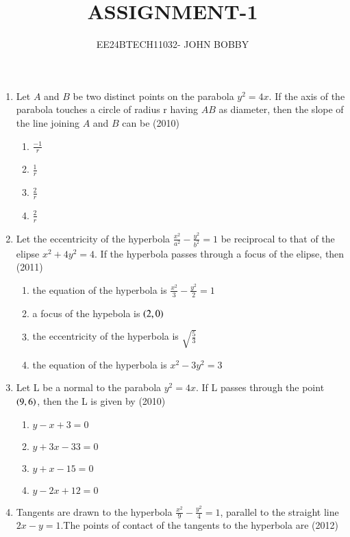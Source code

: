 \documentclass[journal,12pt,twocolumn]{IEEEtran}
\theoremstyle{remark}
\begin{document}

\vspace{3cm}

\title{ASSIGNMENT-1}
\author{EE24BTECH11032- JOHN BOBBY}
\maketitle
\newpage
\bigskip

\begin{enumerate}
	\item Let $A$ and $B$ be two distinct points on the parabola $y^2=4x$. If
the axis of the parabola touches a circle of radius r having
		$AB$ as diameter, then the slope of the line joining $A$ and $B$
 can be 
		\hfill(2010)
		
		\begin{enumerate}
			\item$\frac{-1}{r}$
			\item$\frac{1}{r}$
			\item$\frac{2}{r}$
			\item$\frac{2}{r}$
		\end{enumerate}
	\item Let the eccentricity of the hyperbola $\frac{x^2}{a^2}-\frac{y^2}{b^2}=1$ be reciprocal to that of the elipse $x^2+4y^2=4$. If the hyperbola
	passes through a focus of the elipse, then 
		\hfill(2011)
		
		\begin{enumerate}
			\item the equation of the hyperbola is $\frac{x^2}{3}-\frac{y^2}{2}=1$
			\item a focus of the hypebola is $\left(2,0\right)$
			\item the eccentricity of the hyperbola is $\sqrt{\frac{5}{3}}$
			\item the equation of the hyperbola is $x^2-3y^2=3$
		\end{enumerate}
	\item Let L be a normal to the parabola $y^2=4x$. If L passes through the point $\left(9,6\right)$, then the L is given by 
		\hfill(2010)
		
		\begin{enumerate}
			\item $y-x+3=0$
			\item $y+3x-33=0$
			\item $y+x-15=0$
			\item $y-2x+12=0$
		\end{enumerate}
	\item Tangents are drawn to the hyperbola $\frac{x^2}{9}-\frac{y^2}{4}=1$, parallel to the straight line $2x-y=1$.The points of contact of the tangents to the hyperbola
		are 
		\hfill(2012)
		

\end{enumerate}
\end{document}
